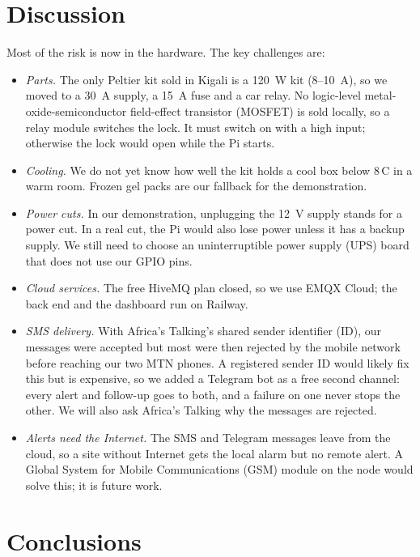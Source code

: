 \documentclass[conference,12pt]{IEEEtran}
\newcommand{\degC}{\,\textdegree{}C}
\begin{document}
\section{Discussion}
\label{sec:discussion}

Most of the risk is now in the hardware. The key challenges are:

\begin{itemize}
\item \emph{Parts.} The only Peltier kit sold in Kigali is a 120~W kit (8--10~A), so we moved to a
30~A supply, a 15~A fuse and a car relay. No logic-level metal-oxide-semiconductor field-effect
transistor (MOSFET) is sold locally, so a relay module switches the lock. It must switch on with a
high input; otherwise the lock would open while the Pi starts.
\item \emph{Cooling.} We do not yet know how well the kit holds a cool box below 8\degC{} in a
warm room. Frozen gel packs are our fallback for the demonstration.
\item \emph{Power cuts.} In our demonstration, unplugging the 12~V supply stands for a power cut.
In a real cut, the Pi would also lose power unless it has a backup supply. We still need to choose
an uninterruptible power supply (UPS) board that does not use our GPIO pins.
\item \emph{Cloud services.} The free HiveMQ plan closed, so we use EMQX Cloud; the back end and
the dashboard run on Railway.
\item \emph{SMS delivery.} With Africa's Talking's shared sender identifier (ID), our messages
were accepted but most were then rejected by the mobile network before reaching our two MTN
phones. A registered sender ID would likely fix this but is expensive, so we added a Telegram bot
as a free second channel: every alert and follow-up goes to both, and a failure on one never stops
the other. We will also ask Africa's Talking why the messages are rejected.
\item \emph{Alerts need the Internet.} The SMS and Telegram messages leave from the cloud, so a
site without Internet gets the local alarm but no remote alert. A Global System for Mobile
Communications (GSM) module on the node would solve this; it is future work.
\end{itemize}

\section{Conclusions}
\end{document}
